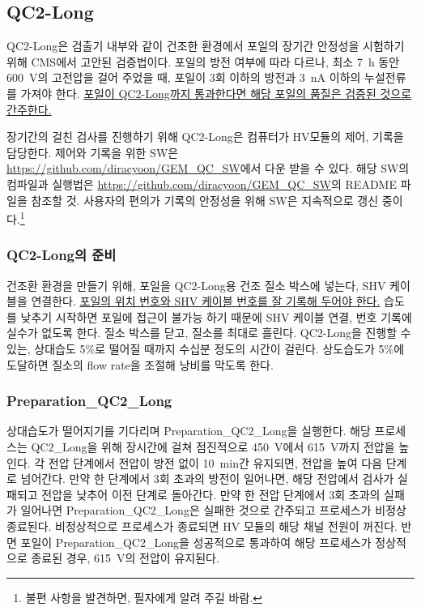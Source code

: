 \subsection{QC2-Long}
QC2-Long은 검출기 내부와 같이 건조한 환경에서 포일의 장기간 안정성을 시험하기 위해 CMS에서 고안된 검증법이다. 포일의 방전 여부에 따라 다르나, 최소 \SI{7}{\hour} 동안 \SI{600}{\volt}의 고전압을 걸어 주었을 때, 포일이 3회 이하의 방전과 \SI{3}{\nano\ampere} 이하의 누설전류를 가져야 한다. \uline{포일이 QC2-Long까지 통과한다면 해당 포일의 품질은 검증된 것으로 간주한다.}

장기간의 걸친 검사를 진행하기 위해 QC2-Long은 컴퓨터가 HV모듈의 제어, 기록을 담당한다. 제어와 기록을 위한 SW은 \url{https://github.com/diracyoon/GEM_QC_SW}에서 다운 받을 수 있다. 해당 SW의 컴파일과 실행법은 \url{https://github.com/diracyoon/GEM_QC_SW}의 README 파일을 참조할 것. 사용자의 편의가 기록의 안정성을 위해 SW은 지속적으로 갱신 중이다.\footnote{불편 사항을 발견하면, 필자에게 알려 주길 바람.}

\subsubsection{QC2-Long의 준비}
건조환 환경을 만들기 위해, 포일을 QC2-Long용 건조 질소 박스에 넣는다, SHV 케이블을 연결한다. \uline{포일의 위치 번호와 SHV 케이블 번호를 잘 기록해 두어야 한다.} 습도를 낮추기 시작하면 포일에 접근이 불가능 하기 때문에 SHV 케이블 연결, 번호 기록에 실수가 없도록 한다. 질소 박스를 닫고, 질소를 최대로 흘린다. QC2-Long을 진행할 수 있는, 상대습도 5\%로 떨어질 때까지 수십분 정도의 시간이 걸린다. 상도습도가 5\%에 도달하면 질소의 flow rate을 조절해 낭비를 막도록 한다.

\subsubsection{Preparation\_QC2\_Long}
상대습도가 떨어지기를 기다리며 Preparation\_QC2\_Long을 실행한다. 해당 프로세스는 QC2\_Long을 위해 장시간에 걸쳐 점진적으로 \SI{450}{\volt}에서  \SI{615}{\volt}까지 전압을 높인다. 각 전압 단계에서 전압이 방전 없이  \SI{10}{\minute}간 유지되면, 전압을 높여 다음 단계로 넘어간다. 만약 한 단계에서 3회 초과의 방전이 일어나면, 해당 전압에서 검사가 실패되고 전압을 낮추어 이전 단계로 돌아간다. 만약 한 전압 단계에서 3회 초과의 실패가 일어나면 Preparation\_QC2\_Long은 실패한 것으로 간주되고 프로세스가 비정상 종료된다. 비정상적으로 프로세스가 종료되면 HV 모듈의 해당 채널 전원이 꺼진다. 반면 포일이 Preparation\_QC2\_Long을 성공적으로 통과하여 해당 프로세스가 정상적으로 종료된 경우, \SI{615}{\volt}의 전압이 유지된다.

